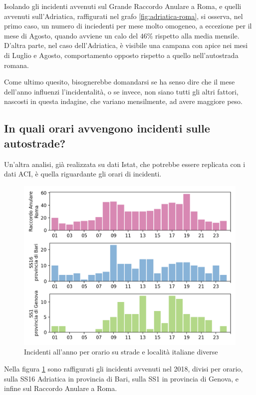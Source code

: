 \documentclass[a4paper]{report}
\begin{document}
Isolando gli incidenti avvenuti sul Grande Raccordo Anulare a Roma, e quelli avvenuti 
sull'Adriatica, raffigurati nel grafo \ref{fig:adriatica-roma}, si osserva, 
nel primo caso, un numero di inciedenti per mese molto omogeneo, a eccezione per il 
mese di Agosto, quando avviene un calo del $46$\% rispetto alla media mensile. 
D'altra parte, nel caso dell'Adriatica, è visibile una campana con apice nei 
mesi di Luglio e Agosto, comportamento opposto rispetto a quello nell'autostrada 
romana.

Come ultimo quesito, bisognerebbe domandarsi se ha senso dire che il mese dell'anno 
influenzi l'incidentalità, o se invece, non siano tutti gli altri fattori, 
nascosti in questa indagine, che variano mensilmente, ad avere maggiore peso. 

\subsection{In quali orari avvengono incidenti sulle autostrade?}

Un'altra analisi, già realizzata su dati Istat, che potrebbe essere replicata 
con i dati ACI, è quella riguardante gli orari di incidenti. 

\begin{figure}
    \includegraphics[width=\linewidth]{../src/incidenti/incidenti_aci/orari/orari.png}
    \caption{Incidenti all'anno per orario su strade e località italiane diverse}
    \label{fig:orari-strade-aci}
\end{figure}

Nella figura \ref{fig:orari-strade-aci} sono raffigurati gli incidenti avvenuti 
nel 2018, divisi per orario, sulla SS16 Adriatica in provincia di Bari, sulla SS1 
in provincia di Genova, e infine sul Raccordo Anulare a Roma.
\end{document}

